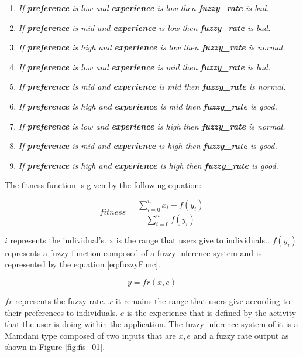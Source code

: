 \begin{enumerate}
	\item \textit{If \textbf{preference} is low and
		\textbf{experience} is low then \textbf{fuzzy\_rate} is bad.}
	\item \textit{If \textbf{preference} is mid and
		\textbf{experience} is low  then \textbf{fuzzy\_rate} is bad.}
	\item \textit{If \textbf{preference} is high and
		\textbf{experience} is low  then \textbf{fuzzy\_rate} is normal.}
	\item \textit{If \textbf{preference} is low and
		\textbf{experience} is mid then \textbf{fuzzy\_rate} is bad.}
	\item \textit{If \textbf{preference} is mid and
		\textbf{experience} is mid  then \textbf{fuzzy\_rate} is normal.}
	\item \textit{If \textbf{preference} is high and
		\textbf{experience} is mid  then \textbf{fuzzy\_rate} is good.}
	\item \textit{If \textbf{preference} is low and
		\textbf{experience} is high then \textbf{fuzzy\_rate} is normal.}
	\item \textit{If \textbf{preference} is mid and
		\textbf{experience} is high  then \textbf{fuzzy\_rate} is good.}
	\item \textit{If \textbf{preference} is high and
		\textbf{experience} is high  then \textbf{fuzzy\_rate} is good.}

\end{enumerate}

The fitness function is given by the following equation:

\begin{equation}\label{eq:fitfunc02}
\displaystyle fitness=\frac{\sum_{i=0}^{n}x_{i}+f(y_{i})}{\sum_{i=0}^{n}f(y_{i})}
\end{equation}

$i$ represents the individual's. x is the range that users give to individuals..
$f(y_i)$ represents a fuzzy function composed of a fuzzy inference system and is
represented by the equation \ref{eq:fuzzyFunc}.

\begin{equation}\label{eq:fuzzyFunc}
\displaystyle y=fr(x,e)
\end{equation}


$fr$ represents the fuzzy rate. $x$ it remains the range that users give
according to their preferences to individuals. $e$  is the experience that is
defined by the activity that the user is doing within the application. The fuzzy
inference system of it is a Mamdani type composed of two inputs that are  $x,e$
and a fuzzy rate output as shown in Figure \ref{fig:fis_01}.


